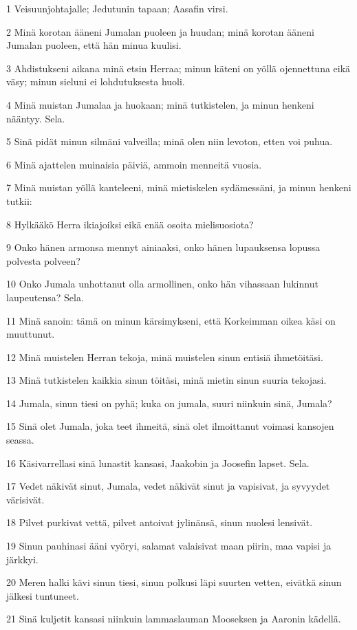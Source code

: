 \par 1 Veisuunjohtajalle; Jedutunin tapaan; Aasafin virsi.
\par 2 Minä korotan ääneni Jumalan puoleen ja huudan; minä korotan ääneni Jumalan puoleen, että hän minua kuulisi.
\par 3 Ahdistukseni aikana minä etsin Herraa; minun käteni on yöllä ojennettuna eikä väsy; minun sieluni ei lohdutuksesta huoli.
\par 4 Minä muistan Jumalaa ja huokaan; minä tutkistelen, ja minun henkeni nääntyy. Sela.
\par 5 Sinä pidät minun silmäni valveilla; minä olen niin levoton, etten voi puhua.
\par 6 Minä ajattelen muinaisia päiviä, ammoin menneitä vuosia.
\par 7 Minä muistan yöllä kanteleeni, minä mietiskelen sydämessäni, ja minun henkeni tutkii:
\par 8 Hylkääkö Herra ikiajoiksi eikä enää osoita mielisuosiota?
\par 9 Onko hänen armonsa mennyt ainiaaksi, onko hänen lupauksensa lopussa polvesta polveen?
\par 10 Onko Jumala unhottanut olla armollinen, onko hän vihassaan lukinnut laupeutensa? Sela.
\par 11 Minä sanoin: tämä on minun kärsimykseni, että Korkeimman oikea käsi on muuttunut.
\par 12 Minä muistelen Herran tekoja, minä muistelen sinun entisiä ihmetöitäsi.
\par 13 Minä tutkistelen kaikkia sinun töitäsi, minä mietin sinun suuria tekojasi.
\par 14 Jumala, sinun tiesi on pyhä; kuka on jumala, suuri niinkuin sinä, Jumala?
\par 15 Sinä olet Jumala, joka teet ihmeitä, sinä olet ilmoittanut voimasi kansojen seassa.
\par 16 Käsivarrellasi sinä lunastit kansasi, Jaakobin ja Joosefin lapset. Sela.
\par 17 Vedet näkivät sinut, Jumala, vedet näkivät sinut ja vapisivat, ja syvyydet värisivät.
\par 18 Pilvet purkivat vettä, pilvet antoivat jylinänsä, sinun nuolesi lensivät.
\par 19 Sinun pauhinasi ääni vyöryi, salamat valaisivat maan piirin, maa vapisi ja järkkyi.
\par 20 Meren halki kävi sinun tiesi, sinun polkusi läpi suurten vetten, eivätkä sinun jälkesi tuntuneet.
\par 21 Sinä kuljetit kansasi niinkuin lammaslauman Mooseksen ja Aaronin kädellä.

